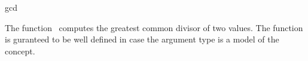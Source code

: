 \begin{ccRefFunction}{gcd}

\ccDefinition

The function \ccRefName\ computes the greatest common divisor of two values.
The function is guranteed to be well defined in case the argument type 
is a model of the  concept.



\ccSeeAlso

\\
\\

\end{ccRefFunction}
